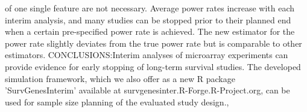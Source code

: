 {{                  of one single feature are not necessary. Average
                  power rates increase with each interim analysis, and
                  many studies can be stopped prior to their planned
                  end when a certain pre-specified power rate is
                  achieved. The new estimator for the power rate
                  slightly deviates from the true power rate but is
                  comparable to other estimators.
                  CONCLUSIONS:Interim
                  analyses of microarray experiments can provide
                  evidence for early stopping of long-term survival
                  studies. The developed simulation framework, which
                  we also offer as a new R package 'SurvGenesInterim'
                  available at survgenesinter.R-Forge.R-Project.org,
                  can be used for sample size planning of the
                  evaluated study design.},
}